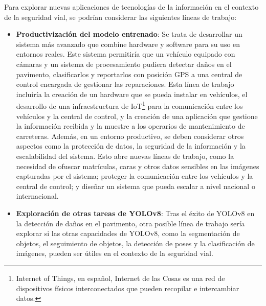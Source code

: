 Para explorar nuevas aplicaciones de tecnologías de la información en el contexto de la seguridad vial, se podrían considerar las siguientes líneas de trabajo:

\begin{itemize}
    \item \textbf{Productivización del modelo entrenado}: Se trata de desarrollar un sistema más avanzado que combine hardware y software para su uso en entornos reales. Este sistema permitiría que un vehículo equipado con cámaras y un sistema de procesamiento pudiera detectar daños en el pavimento, clasificarlos y reportarlos con posición GPS a una central de control encargada de gestionar las reparaciones. Esta línea de trabajo incluiría la creación de un hardware que se pueda instalar en vehículos, el desarrollo de una infraestructura de IoT\footnote{Internet of Things, en español, Internet de las Cosas es una red de dispositivos físicos interconectados que pueden recopilar e intercambiar datos.} para la comunicación entre los vehículos y la central de control, y la creación de una aplicación que gestione la información recibida y la muestre a los operarios de mantenimiento de carreteras. Además, en un entorno productivo, se deben considerar otros aspectos como la protección de datos, la seguridad de la información y la escalabilidad del sistema. Esto abre nuevas líneas de trabajo, como la necesidad de ofuscar matrículas, caras y otros datos sensibles en las imágenes capturadas por el sistema; proteger la comunicación entre los vehículos y la central de control; y diseñar un sistema que pueda escalar a nivel nacional o internacional.
    
    \item \textbf{Exploración de otras tareas de YOLOv8}: Tras el éxito de YOLOv8 en la detección de daños en el pavimento, otra posible línea de trabajo sería explorar si las otras capacidades de YOLOv8, como la segmentación de objetos, el seguimiento de objetos, la detección de poses y la clasificación de imágenes, pueden ser útiles en el contexto de la seguridad vial.
\end{itemize}